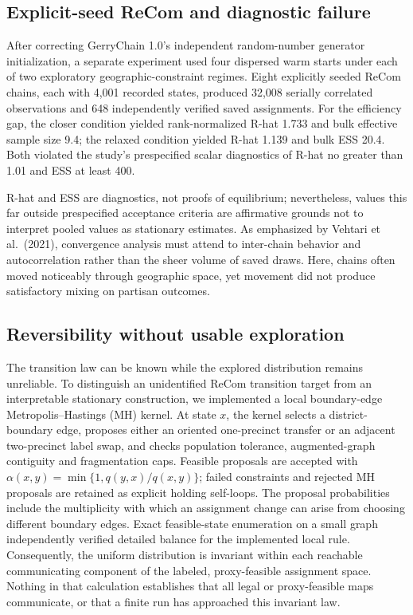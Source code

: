 \documentclass[
  10pt,
]{article}
\begin{document}
\hypertarget{explicit-seed-recom-and-diagnostic-failure}{%
\subsection{Explicit-seed ReCom and diagnostic
failure}\label{explicit-seed-recom-and-diagnostic-failure}}

After correcting GerryChain 1.0's independent random-number generator
initialization, a separate experiment used four dispersed warm starts
under each of two exploratory geographic-constraint regimes. Eight
explicitly seeded ReCom chains, each with 4,001 recorded states,
produced 32,008 serially correlated observations and 648 independently
verified saved assignments. For the efficiency gap, the closer condition
yielded rank-normalized R-hat 1.733 and bulk effective sample size 9.4;
the relaxed condition yielded R-hat 1.139 and bulk ESS 20.4. Both
violated the study's prespecified scalar diagnostics of R-hat no greater
than 1.01 and ESS at least 400.

R-hat and ESS are diagnostics, not proofs of equilibrium; nevertheless,
values this far outside prespecified acceptance criteria are affirmative
grounds not to interpret pooled values as stationary estimates. As
emphasized by Vehtari et al.~(2021), convergence analysis must attend to
inter-chain behavior and autocorrelation rather than the sheer volume of
saved draws. Here, chains often moved noticeably through geographic
space, yet movement did not produce satisfactory mixing on partisan
outcomes.

\hypertarget{reversibility-without-usable-exploration}{%
\subsection{Reversibility without usable
exploration}\label{reversibility-without-usable-exploration}}

The transition law can be known while the explored distribution remains
unreliable. To distinguish an unidentified ReCom transition target from
an interpretable stationary construction, we implemented a local
boundary-edge Metropolis--Hastings (MH) kernel. At state \(x\), the
kernel selects a district-boundary edge, proposes either an oriented
one-precinct transfer or an adjacent two-precinct label swap, and checks
population tolerance, augmented-graph contiguity and fragmentation caps.
Feasible proposals are accepted with
\(\alpha(x,y)=\min\{1,q(y,x)/q(x,y)\}\); failed constraints and rejected
MH proposals are retained as explicit holding self-loops. The proposal
probabilities include the multiplicity with which an assignment change
can arise from choosing different boundary edges. Exact feasible-state
enumeration on a small graph independently verified detailed balance for
the implemented local rule. Consequently, the uniform distribution is
invariant within each reachable communicating component of the labeled,
proxy-feasible assignment space. Nothing in that calculation establishes
that all legal or proxy-feasible maps communicate, or that a finite run
has approached this invariant law.
\end{document}

